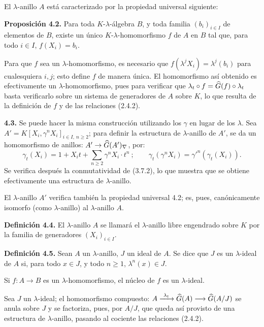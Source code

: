 El \(\lambda\)-anillo \(A\) está caracterizado por la propiedad universal siguiente:

\textbf{Proposición 4.2.} Para toda \(K\)-\(\lambda\)-álgebra \(B\), y toda familia \((b_i)_{i\in I}\) de elementos de \(B\), existe un único \(K\)-\(\lambda\)-homomorfismo \(f\) de \(A\) en \(B\) tal que, para todo \(i\in I\), \(f(X_i)=b_i\).

Para que \(f\) sea un \(\lambda\)-homomorfismo, es necesario que \(f(\lambda^j X_i)=\lambda^j(b_i)\) para cualesquiera \(i,j\); esto define \(f\) de manera única. El homomorfismo así obtenido es efectivamente un \(\lambda\)-homomorfismo, pues para verificar que \(\lambda_t\circ f=\widehat G(f)\circ\lambda_t\) basta verificarlo sobre un sistema de generadores de \(A\) sobre \(K\), lo que resulta de la definición de \(f\) y de las relaciones (2.4.2).

\textbf{4.3.} Se puede hacer la misma construcción utilizando los \(\gamma\) en lugar de los \(\lambda\). Sea \(A'=K[X_i,\gamma^n X_i]_{i\in I,\ n\ge2}\); para definir la estructura de \(\lambda\)-anillo de \(A'\), se da un homomorfismo de anillos: \(A'\to\widehat G(A')_\nabla\), por:
\begin{equation}\tag{4.3.1}
  \gamma_t(X_i)=1+X_it+\sum_{n\ge2}\gamma^n X_i\cdot t^n~;
  \qquad
  \gamma_t(\gamma^n X_i)=\gamma'^n(\gamma_t(X_i)).
\end{equation}
Se verifica después la conmutatividad de (3.7.2), lo que muestra que se obtiene efectivamente una estructura de \(\lambda\)-anillo.

El \(\lambda\)-anillo \(A'\) verifica también la propiedad universal 4.2; es, pues, canónicamente isomorfo (como \(\lambda\)-anillo) al \(\lambda\)-anillo \(A\).

\textbf{Definición 4.4.} El \(\lambda\)-anillo \(A\) se llamará el \(\lambda\)-anillo libre engendrado sobre \(K\) por la familia de generadores \((X_i)_{i\in I}\).

\textbf{Definición 4.5.} Sean \(A\) un \(\lambda\)-anillo, \(J\) un ideal de \(A\). Se dice que \(J\) es un \(\lambda\)-ideal de \(A\) si, para todo \(x\in J\), y todo \(n\ge1\), \(\lambda^n(x)\in J\).

Si \(f:A\to B\) es un \(\lambda\)-homomorfismo, el núcleo de \(f\) es un \(\lambda\)-ideal.

Sea \(J\) un \(\lambda\)-ideal; el homomorfismo compuesto: \(A\xrightarrow{\ \lambda_t\ }\Ghat(A)\longrightarrow\Ghat(A/J)\) se anula sobre \(J\) y se factoriza, pues, por \(A/J\), que queda así provisto de una estructura de \(\lambda\)-anillo, pasando al cociente las relaciones (2.4.2).

